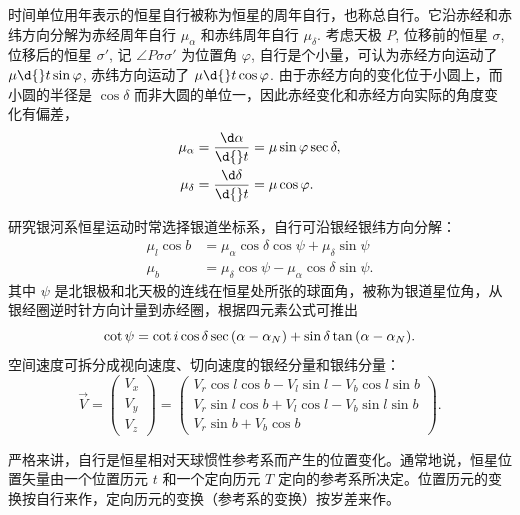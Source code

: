 \documentclass[UTF8, 12pt, a4paper, oneside, onecolumn, fontset=none]{ctexart}
\begin{document}
时间单位用年表示的恒星自行被称为恒星的周年自行，也称总自行。它沿赤经和赤纬方向分解为赤经周年自行 $\mu_{\alpha}$ 和赤纬周年自行 $\mu_{\delta}$. 考虑天极 $P$, 位移前的恒星 $\sigma$, 位移后的恒星 $\sigma'$, 记 $\angle{P\sigma\sigma'}$ 为位置角 $\varphi$, 自行是个小量，可认为赤经方向运动了 $\mu\d{}t\sin{\varphi}$, 赤纬方向运动了 $\mu\d{}t\cos{\varphi}$. 由于赤经方向的变化位于小圆上，而小圆的半径是 $\cos{\delta}$ 而非大圆的单位一，因此赤经变化和赤经方向实际的角度变化有偏差，
\begin{align}
\mu_{\alpha}&=\frac{\d\alpha}{\d{}t}=\mu\sin{\varphi}\sec{\delta},\label{6.2.5}\\
\mu_{\delta}&=\frac{\d\delta}{\d{}t}=\mu\cos{\varphi}.\label{6.2.6}
\end{align}

研究银河系恒星运动时常选择银道坐标系，自行可沿银经银纬方向分解：
\begin{align}
\mu_{l}\cos{b}&=\mu_{\alpha}\cos{\delta}\cos{\psi}+\mu_{\delta}\sin{\psi}\\
\mu_{b}&=\mu_{\delta}\cos{\psi}-\mu_{\alpha}\cos{\delta}\sin{\psi}.
\end{align}
其中 $\psi$ 是北银极和北天极的连线在恒星处所张的球面角，被称为银道星位角，从银经圈逆时针方向计量到赤经圈，根据四元素公式可推出
\begin{equation}
\cot{\psi}=\cot{i}\cos{\delta}\sec{\mleft(\alpha-\alpha_{N}\mright)}+\sin{\delta}\tan{\mleft(\alpha-\alpha_{N}\mright)}.
\end{equation}
空间速度可拆分成视向速度、切向速度的银经分量和银纬分量：
\begin{equation}
\vec{V}=\begin{pmatrix}
V_{x}\\
V_{y}\\
V_{z}
\end{pmatrix}=\begin{pmatrix}
V_{r}\cos{l}\cos{b}-V_{l}\sin{l}-V_{b}\cos{l}\sin{b}\\
V_{r}\sin{l}\cos{b}+V_{l}\cos{l}-V_{b}\sin{l}\sin{b}\\
V_{r}\sin{b}+V_{b}\cos{b}
\end{pmatrix}.
\end{equation}

严格来讲，自行是恒星相对天球惯性参考系而产生的位置变化。通常地说，恒星位置矢量由一个位置历元 $t$ 和一个定向历元 $T$ 定向的参考系所决定。位置历元的变换按自行来作，定向历元的变换（参考系的变换）按岁差来作。
\end{document}
